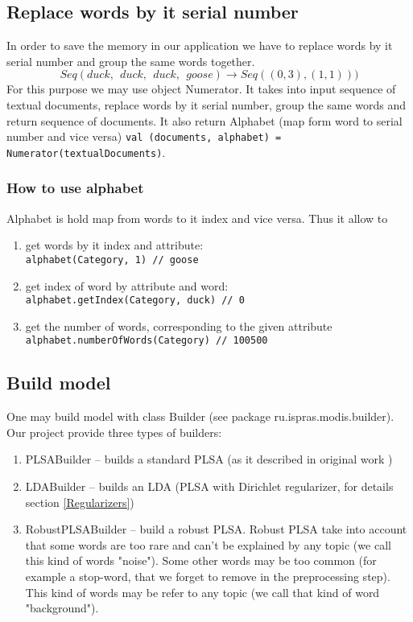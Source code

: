 \subsection{Replace words by it serial number}
    In order to save the memory in our application we have to replace words by it serial number and group the same words together.
    $$ Seq(duck, \ \ duck, \ \ duck, \ \ goose) \to Seq((0, 3), (1, 1))) $$
    For this purpose we may use object Numerator. It takes into input sequence of textual documents, replace words by it serial number,
    group the same words and return sequence of documents. It also return Alphabet (map form word to serial number and vice versa)
    \texttt{val (documents, alphabet) = Numerator(textualDocuments)}.\\ 
    \subsubsection{How to use alphabet}
	Alphabet is hold map from words to it index and vice versa. Thus it allow to
	\begin{enumerate}
	    \item get words by it index and attribute:\\
		\texttt{alphabet(Category, 1) // goose}
	    \item get index of word by attribute and word: \\
		\texttt{alphabet.getIndex(Category, duck) // 0}
	    \item get the number of words, corresponding to the given attribute \\
		\texttt{alphabet.numberOfWords(Category) // 100500}
	\end{enumerate}
	
\subsection{Build model}
    One may build model with class Builder (see package ru.ispras.modis.builder). Our project provide three types of builders:
    \begin{enumerate}
	\item PLSABuilder \--- builds a standard PLSA (as it described in original work \cite{PLSA_original})
	\item LDABuilder  \--- builds an LDA (PLSA with Dirichlet regularizer, for details section \ref{Regularizers}) %
	\item RobustPLSABuilder \--- build a robust PLSA. Robust PLSA take into account that some words are too rare and can't be explained by any topic 
	    (we call this kind of words "noise"). Some other words may be too common (for example a stop\--word, that we forget to remove in the preprocessing step). This kind of words
	    may be refer to any topic (we call that kind of word "background").  
    \end{enumerate}

